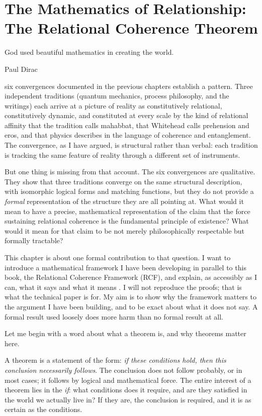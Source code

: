 \chapter[The Mathematics of Relationship]{The Mathematics of Relationship: The Relational Coherence Theorem}
\label{ch:rct}

\epigraph{God used beautiful mathematics in creating the world.}{Paul Dirac}

 six convergences documented in the previous chapters establish a pattern. Three independent traditions (quantum mechanics, process philosophy, and the \bahai writings) each arrive at a picture of reality as constitutively relational, constitutively dynamic, and constituted at every scale by the kind of relational affinity that the \bahai tradition calls mahabbat, that Whitehead calls prehension and eros, and that physics describes in the language of coherence and entanglement. The convergence, as I have argued, is structural rather than verbal: each tradition is tracking the same feature of reality through a different set of instruments.

But one thing is missing from that account. The six convergences are qualitative. They show that three traditions converge on the same structural description, with isomorphic logical forms and matching functions, but they do not provide a \emph{formal} representation of the structure they are all pointing at. What would it mean to have a precise, mathematical representation of the claim that the force sustaining relational coherence is the fundamental principle of existence? What would it mean for that claim to be not merely philosophically respectable but formally tractable?

This chapter is about one formal contribution to that question. I want to introduce a mathematical framework I have been developing in parallel to this book, the Relational Coherence Framework (RCF), and explain, as accessibly as I can, what it says and what it means \citep{AdamsRCT}. I will not reproduce the proofs; that is what the technical paper is for. My aim is to show why the framework matters to the argument I have been building, and to be exact about what it does not say. A formal result used loosely does more harm than no formal result at all.

Let me begin with a word about what a theorem is, and why theorems matter here.

A theorem is a statement of the form: \emph{if these conditions hold, then this conclusion necessarily follows}. The conclusion does not follow probably, or in most cases; it follows by logical and mathematical force. The entire interest of a theorem lies in the \emph{if}: what conditions does it require, and are they satisfied in the world we actually live in? If they are, the conclusion is required, and it is as certain as the conditions.

